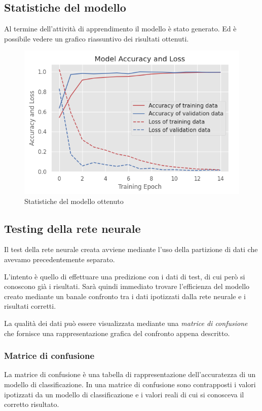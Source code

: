 \subsection{Statistiche del modello}
Al termine dell'attività di apprendimento il modello è stato generato. Ed è possibile vedere un grafico 
riassuntivo dei risultati ottenuti.
\begin{figure}[H]
    \centering
    \includegraphics[scale = 0.60]{assets/images/classifications/accelerometer/right_hand/model-right-hand-acc.png}
    \caption{Statistiche del modello ottenuto}
\end{figure}


\subsection{Testing della rete neurale}
Il test della rete neurale creata avviene mediante l'uso della partizione di dati che avevamo precedentemente separato.

L'intento è quello di effettuare una predizione con i dati di test, di cui però si conoscono già i risultati. 
Sarà quindi immediato trovare l'efficienza del modello creato mediante un banale confronto tra i dati ipotizzati 
dalla rete neurale e i risultati corretti.

La qualità dei dati può essere visualizzata mediante una \textit{matrice di confusione} che fornisce una rappresentazione 
grafica del confronto appena descritto.

\subsubsection{Matrice di confusione}
La matrice di confusione è una tabella di rappresentazione dell'accuratezza di un modello di classificazione. 
In una matrice di confusione sono contrapposti i valori ipotizzati da un modello di classificazione e i valori reali 
di cui si conosceva il corretto risultato.

